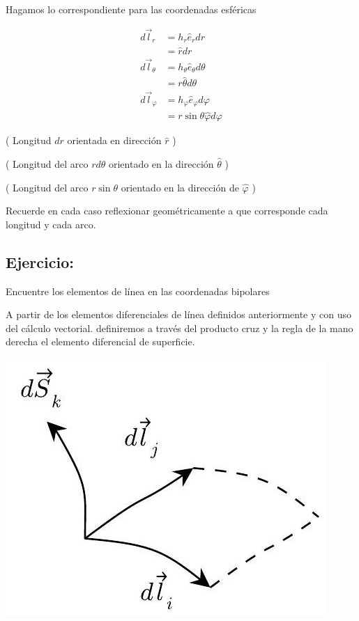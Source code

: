 Hagamos lo correspondiente para las coordenadas esféricas

$$
\begin{aligned}
d \vec{l}_{r} & =h_{r} \widehat{e}_{r} d r \\
& =\widehat{r} d r \\
d \vec{l}_{\theta} & =h_{\theta} \widehat{e}_{\theta} d \theta \\
& =r \widehat{\theta} d \theta \\
d \vec{l}_{\varphi} & =h_{\varphi} \widehat{e}_{\varphi} d \varphi \\
& =r \sin \theta \widehat{\varphi} d \varphi
\end{aligned}
$$

( Longitud $d r$ orientada en dirección $\widehat{r}$ )

( Longitud del arco $r d \theta$ orientado en la dirección $\widehat{\theta}$ )

( Longitud del arco $r \sin \theta$ orientado en la dirección de $\widehat{\varphi}$ )

Recuerde en cada caso reflexionar geométricamente a que corresponde cada longitud y cada arco.

\subsection{Ejercicio:}
Encuentre los elementos de línea en las coordenadas bipolares

A partir de los elementos diferenciales de línea definidos anteriormente y con uso del cálculo vectorial. definiremos a través del producto cruz y la regla de la mano derecha el elemento diferencial de superficie.

\begin{center}
\includegraphics[max width=\textwidth]{2023_01_15_4065f1f4fc9993406c61g-3}
\end{center}

